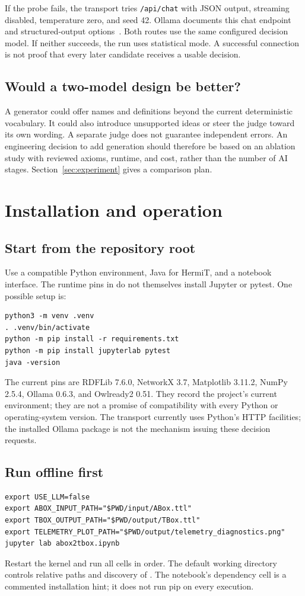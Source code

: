 \documentclass[11pt,a4paper]{article}
\newcommand{\code}[1]{\nolinkurl{#1}}
\newcommand{\file}[1]{\path{#1}}
\begin{document}
If the probe fails, the transport tries \code{/api/chat} with JSON output,
streaming disabled, temperature zero, and seed 42. Ollama documents this chat
endpoint and structured-output options~\cite{ollama}. Both routes use the same
configured decision model. If neither succeeds, the run uses statistical mode.
A successful connection is not proof that every later candidate receives a
usable decision.

\subsection{Would a two-model design be better?}
A generator could offer names and definitions beyond the current deterministic
vocabulary. It could also introduce unsupported ideas or steer the judge toward
its own wording. A separate judge does not guarantee independent errors.
An engineering decision to add generation should therefore be based on an
ablation study with reviewed axioms, runtime, and cost, rather than the number
of AI stages. Section~\ref{sec:experiment} gives a comparison plan.

\section{Installation and operation}\label{sec:operation}

\subsection{Start from the repository root}
Use a compatible Python environment, Java for HermiT, and a notebook interface.
The runtime pins in \file{requirements.txt} do not themselves install Jupyter
or pytest. One possible setup is:
\begin{lstlisting}
python3 -m venv .venv
. .venv/bin/activate
python -m pip install -r requirements.txt
python -m pip install jupyterlab pytest
java -version
\end{lstlisting}
The current pins are RDFLib 7.6.0, NetworkX 3.7, Matplotlib 3.11.2, NumPy 2.5.4,
Ollama 0.6.3, and Owlready2 0.51. They record the project's current environment;
they are not a promise of compatibility with every Python or operating-system
version. The transport currently uses Python's HTTP facilities; the installed
Ollama package is not the mechanism issuing these decision requests.

\subsection{Run offline first}
\begin{lstlisting}
export USE_LLM=false
export ABOX_INPUT_PATH="$PWD/input/ABox.ttl"
export TBOX_OUTPUT_PATH="$PWD/output/TBox.ttl"
export TELEMETRY_PLOT_PATH="$PWD/output/telemetry_diagnostics.png"
jupyter lab abox2tbox.ipynb
\end{lstlisting}
Restart the kernel and run all cells in order. The default working directory
controls relative paths and discovery of \file{pipeline_support.py}. The
notebook's dependency cell is a commented installation hint; it does not run pip
on every execution.
\end{document}
